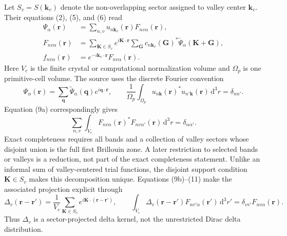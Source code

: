 Let $S_v=S(\mathbf k_v)$ denote the non-overlapping sector assigned to valley
center $\mathbf k_v$. Their equations (2), (5), and (6) read
\begin{align}
  \Psi_\alpha(\mathbf r)
  &=
  \sum_{n,v}u_{n\mathbf k_v}(\mathbf r)
  F_{nv\alpha}(\mathbf r),
  \label{eq:ermoneit-valley-expansion}\\
  F_{nv\alpha}(\mathbf r)
  &=
  \sum_{\mathbf K\in S_v}
  e^{i\mathbf K\cdot\mathbf r}
  \sum_{\mathbf G}c_{n\mathbf k_v}(\mathbf G)^{*}
  \widetilde\Psi_\alpha(\mathbf K+\mathbf G),
  \label{eq:ermoneit-sector-envelope}\\
  f_{nv\alpha}(\mathbf r)
  &=
  e^{-i\mathbf k_v\cdot\mathbf r}F_{nv\alpha}(\mathbf r).
  \label{eq:ermoneit-slow-envelope}
\end{align}
Here $V_c$ is the finite crystal or computational normalization volume and
$\Omega_p$ is one primitive-cell volume. The source uses the discrete Fourier
convention
\begin{equation}
  \Psi_\alpha(\mathbf r)
  =
  \sum_{\mathbf q}\widetilde\Psi_\alpha(\mathbf q)
  e^{i\mathbf q\cdot\mathbf r},
  \qquad
  \frac{1}{\Omega_p}\int_{\Omega_p}
  u_{n\mathbf k}(\mathbf r)^{*}u_{n'\mathbf k}(\mathbf r)\,\mathrm{d}^3r
  =\delta_{nn'}.
  \label{eq:ermoneit-source-normalization}
\end{equation}
Equation (9a) correspondingly gives
\begin{equation}
  \sum_{n,v}\int_{V_c}
  F_{nv\alpha}(\mathbf r)^{*}F_{nv\alpha'}(\mathbf r)\,\mathrm{d}^3r
  =\delta_{\alpha\alpha'}.
  \label{eq:ermoneit-envelope-normalization}
\end{equation}
Exact completeness requires all bands and a collection of valley sectors whose
disjoint union is the full first Brillouin zone. A later restriction to selected
bands or valleys is a reduction, not part of the exact completeness statement.
Unlike an informal sum of valley-centered trial functions, the disjoint support
condition $\mathbf K\in S_v$ makes this decomposition unique. Equations
(9b)--(11) make the associated projection explicit through
\begin{equation}
  \Delta_v(\mathbf r-\mathbf r')
  =
  \frac{1}{V_c}
  \sum_{\mathbf K\in S_v}
  e^{i\mathbf K\cdot(\mathbf r-\mathbf r')},
  \qquad
  \int_{V_c}\!\Delta_v(\mathbf r-\mathbf r')
  F_{n v'\alpha}(\mathbf r')\,\mathrm{d}^3r'
  =
  \delta_{vv'}F_{nv\alpha}(\mathbf r).
  \label{eq:ermoneit-sector-projector}
\end{equation}
Thus $\Delta_v$ is a sector-projected delta kernel, not the unrestricted Dirac
delta distribution.

